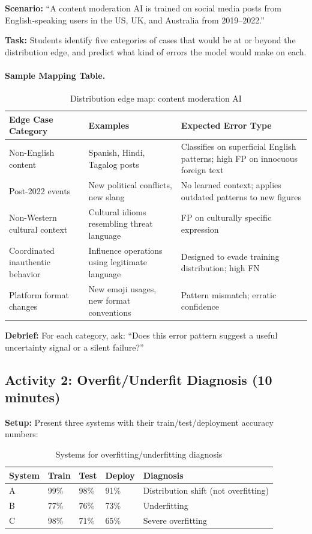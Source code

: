 \textbf{Scenario:} ``A content moderation AI is trained on social media posts from English-speaking users in the US, UK, and Australia from 2019--2022.''

\textbf{Task:} Students identify five categories of cases that would be at or beyond the distribution edge, and predict what kind of errors the model would make on each.

\paragraph{Sample Mapping Table.}
\begin{table}[htbp]
\caption{Distribution edge map: content moderation AI}
\label{tab:edge-map-ch03}
\centering
\begin{tabular}{@{}p{3.5cm}p{3.5cm}p{4.5cm}@{}}
\toprule
\textbf{Edge Case Category} & \textbf{Examples} & \textbf{Expected Error Type} \\
\midrule
Non-English content & Spanish, Hindi, Tagalog posts & Classifies on superficial English patterns; high FP on innocuous foreign text \\
Post-2022 events & New political conflicts, new slang & No learned context; applies outdated patterns to new figures \\
Non-Western cultural context & Cultural idioms resembling threat language & FP on culturally specific expression \\
Coordinated inauthentic behavior & Influence operations using legitimate language & Designed to evade training distribution; high FN \\
Platform format changes & New emoji usages, new format conventions & Pattern mismatch; erratic confidence \\
\bottomrule
\end{tabular}
\end{table}

\textbf{Debrief:} For each category, ask: ``Does this error pattern suggest a useful uncertainty signal or a silent failure?''

\subsection{Activity 2: Overfit/Underfit Diagnosis (10 minutes)}

\textbf{Setup:} Present three systems with their train/test/deployment accuracy numbers:

\begin{table}[htbp]
\caption{Systems for overfitting/underfitting diagnosis}
\label{tab:diagnosis-ch03}
\centering
\begin{tabular}{@{}p{2cm}p{2.5cm}p{2.5cm}p{2.5cm}p{4cm}@{}}
\toprule
\textbf{System} & \textbf{Train} & \textbf{Test} & \textbf{Deploy} & \textbf{Diagnosis} \\
\midrule
A & 99\% & 98\% & 91\% & Distribution shift (not overfitting) \\
B & 77\% & 76\% & 73\% & Underfitting \\
C & 98\% & 71\% & 65\% & Severe overfitting \\
\bottomrule
\end{tabular}
\end{table}

